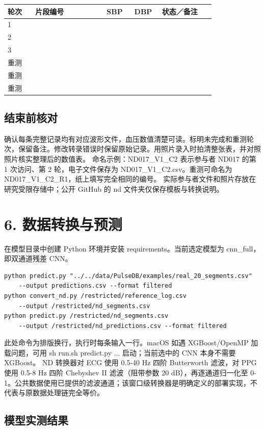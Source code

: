 \documentclass[11pt,letterpaper]{article}
\renewcommand{\arraystretch}{1.22}
\begin{document}
\par\smallskip
\begin{tabular}{@{}p{0.12\linewidth}p{0.31\linewidth}p{0.12\linewidth}p{0.12\linewidth}p{0.23\linewidth}@{}}\toprule
轮次 & 片段编号 & SBP & DBP & 状态／备注\\\midrule
1 &  &  &  & \\
2 &  &  &  & \\
3 &  &  &  & \\
重测 &  &  &  & \\
重测 &  &  &  & \\
重测 &  &  &  & \\
\bottomrule\end{tabular}\par\smallskip
\renewcommand{\arraystretch}{1.22}
\subsection*{结束前核对}
确认每条完整记录均有对应波形文件，血压数值清楚可读。标明未完成和重测轮次，保留备注。修改转录错误时保留原始记录。用照片录入时拍清整张表，并对照照片核实整理后的数值表。
命名示例：ND017\_V1\_C2 表示参与者 ND017 的第 1 次访问、第 2 轮，电子文件保存为 ND017\_V1\_C2.csv。重测可命名为 ND017\_V1\_C2\_R1，纸上填写完全相同的编号。
实际参与者文件和照片存放在研究受限存储中；公开 GitHub 的 nd 文件夹仅保存模板与转换说明。\newpage
\section*{6. 数据转换与预测}
在模型目录中创建 Python 环境并安装 requirements。当前选定模型为 cnn\_full，即双通道残差 CNN。
\begin{verbatim}
python predict.py "../../data/PulseDB/examples/real_20_segments.csv" 
    --output predictions.csv --format filtered
python convert_nd.py /restricted/reference_log.csv 
    --output /restricted/nd_segments.csv
python predict.py /restricted/nd_segments.csv 
    --output /restricted/nd_predictions.csv --format filtered
\end{verbatim}
此处命令为排版换行，执行时每条输入一行。macOS 如遇 XGBoost/OpenMP 加载问题，可用 sh run.sh predict.py ... 启动；当前选中的 CNN 本身不需要 XGBoost。
ND 转换器对 ECG 使用 0.5-40 Hz 四阶 Butterworth 滤波，对 PPG 使用 0.5-8 Hz 四阶 Chebyshev II 滤波（阻带参数 20 dB），再逐通道归一化至 0-1。公共数据使用已提供的滤波通道；该窗口级转换器是明确定义的部署实现，不代表与原数据处理链完全等价。
\subsection*{模型实测结果}
\end{document}
